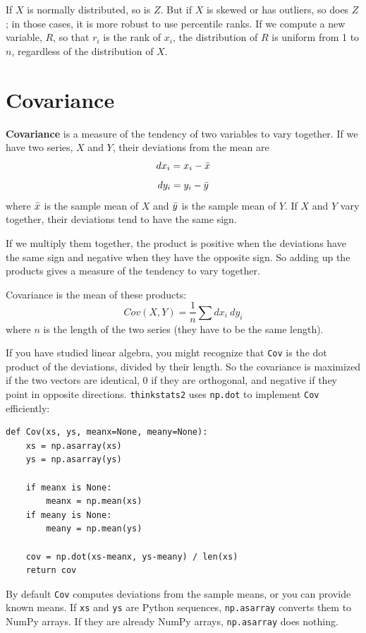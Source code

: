 \documentclass[12pt]{book}
\begin{document}
If $X$ is normally distributed, so is $Z$.  But if $X$ is skewed or has
outliers, so does $Z$; in those cases, it is more robust to use
percentile ranks.  If we compute a new variable, $R$, so that $r_i$ is
the rank of $x_i$, the distribution of $R$ is uniform
from 1 to $n$, regardless of the distribution of $X$.
 


\section{Covariance}

{\bf Covariance} is a measure of the tendency of two variables
to vary together.  If we have two series, $X$ and $Y$, their
deviations from the mean are
%
\[ dx_i = x_i - \bar{x} \]
\[ dy_i = y_i - \bar{y} \]
%
where $\bar{x}$ is the sample mean of $X$ and $\bar{y}$ is the sample mean
of $Y$.  If $X$ and $Y$ vary together, their deviations tend to have
the same sign.

If we multiply them together, the product is positive when the
deviations have the same sign and negative when they have the opposite
sign.  So adding up the products gives a measure of the tendency to
vary together.

Covariance is the mean of these products:
%
\[ Cov(X,Y) = \frac{1}{n} \sum dx_i~dy_i \]
%
where $n$ is the length of the two series (they have to be the same
length).

If you have studied linear algebra, you might recognize that
\verb"Cov" is the dot product of the deviations, divided
by their length.  So the covariance is maximized if the two vectors
are identical, 0 if they are orthogonal, and negative if they
point in opposite directions.  \verb"thinkstats2" uses \verb"np.dot" to
implement \verb"Cov" efficiently:

\begin{verbatim}
def Cov(xs, ys, meanx=None, meany=None):
    xs = np.asarray(xs)
    ys = np.asarray(ys)

    if meanx is None:
        meanx = np.mean(xs)
    if meany is None:
        meany = np.mean(ys)

    cov = np.dot(xs-meanx, ys-meany) / len(xs)
    return cov
\end{verbatim}

By default \verb"Cov" computes deviations from the sample means,
or you can provide known means.  If \verb"xs" and \verb"ys" are
Python sequences, \verb"np.asarray" converts them to NumPy arrays.
If they are already NumPy arrays, \verb"np.asarray" does nothing.
\end{document}
